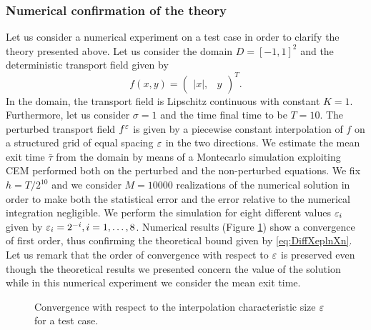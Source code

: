 \subsubsection{Numerical confirmation of the theory}

Let us consider a numerical experiment on a test case in order to clarify the theory presented above. Let us consider the domain $D = [-1, 1]^2$ and the deterministic transport field given by
\begin{equation*}
	f(x, y) = \begin{pmatrix} |x|, & y \end{pmatrix}^T.
\end{equation*}
In the domain, the transport field is Lipschitz continuous with constant $K = 1$. Furthermore, let us consider $\sigma = 1$ and the time final time to be $T = 10$. The perturbed transport field $f^\varepsilon$ is given by a piecewise constant interpolation of $f$ on a structured grid of equal spacing $\varepsilon$ in the two directions. We estimate the mean exit time $\bar\tau$ from the domain by means of a Montecarlo simulation exploiting CEM performed both on the perturbed and the non-perturbed equations. We fix $h = T / 2^{10}$ and we consider $M = 10000$ realizations of the numerical solution in order to make both the statistical error and the error relative to the numerical integration negligible. We perform the simulation for eight different values $\varepsilon_i$ given by $\varepsilon_i = 2^{-i}, i = 1,\dots, 8$. Numerical results (Figure \ref{fig:ConvTheory}) show a convergence of first order, thus confirming the theoretical bound given by \eqref{eq:DiffXeplnXn}. Let us remark that the order of convergence with respect to $\varepsilon$ is preserved even though the theoretical results we presented concern the value of the solution while in this numerical experiment we consider the mean exit time.

\begin{figure}[t]
    \centering
    \resizebox{0.6\linewidth}{!}{ }  
    \caption{Convergence with respect to the interpolation characteristic size $\varepsilon$ for a test case.}
    \label{fig:ConvTheory}
\end{figure}
